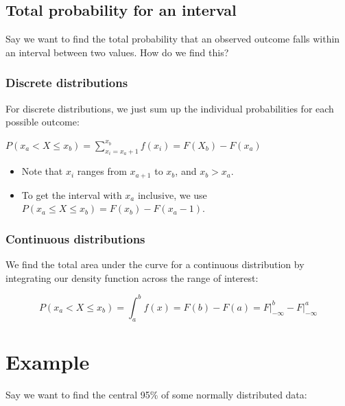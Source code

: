 \documentclass[
]{article}
\providecommand{\tightlist}{%
  \setlength{\itemsep}{0pt}\setlength{\parskip}{0pt}}
\begin{document}
\hypertarget{total-probability-for-an-interval}{%
\subsection{Total probability for an
interval}\label{total-probability-for-an-interval}}

Say we want to find the total probability that an observed outcome falls
within an interval between two values. How do we find this?

\hypertarget{discrete-distributions}{%
\subsubsection{Discrete distributions}\label{discrete-distributions}}

For discrete distributions, we just sum up the individual probabilities
for each possible outcome:

\(P(x_a \lt X \le x_b) = \sum_{x_i=x_a+1}^{x_b} f(x_i) = F(X_b) - F(x_a)\)

\begin{itemize}
\tightlist
\item
  Note that \(x_i\) ranges from \(x_{a+1}\) to \(x_b\), and
  \(x_b \gt x_a\).
\item
  To get the interval with \(x_a\) inclusive, we use
  \(P(x_a \le X \le x_b) = F(x_b) - F(x_a-1)\).
\end{itemize}

\hypertarget{continuous-distributions}{%
\subsubsection{Continuous
distributions}\label{continuous-distributions}}

We find the total area under the curve for a continuous distribution by
integrating our density function across the range of interest:

\[ P(x_a \lt X \le x_b) = \int_{a}^{b} f(x)  = F(b) - F(a) = F\Biggr|_{-\infty}^{b} - F\Biggr|_{-\infty}^{a}\]

\hypertarget{example-1}{%
\section{Example}\label{example-1}}

Say we want to find the central 95\% of some normally distributed data:
\end{document}
